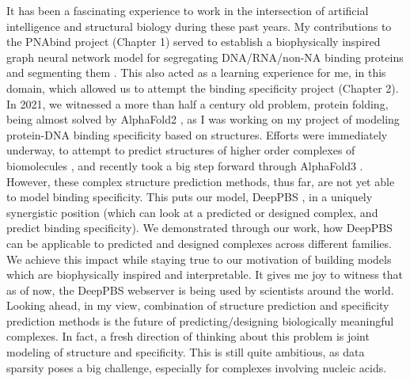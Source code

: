 
It has been a fascinating experience to work in the intersection of artificial intelligence and structural biology during these past years. My contributions to the PNAbind project (Chapter 1) served to establish a biophysically inspired graph neural network model for segregating DNA/RNA/non-NA binding proteins and segmenting them \citep{Sagendorf2024}. This also acted as a learning experience for me, in this domain, which allowed us to attempt the binding specificity project (Chapter 2). In 2021, we witnessed a more than half a century old problem, protein folding, being almost solved by AlphaFold2 \citep{Jumper2021}, as I was working on my project of modeling protein-DNA binding specificity based on structures. Efforts were immediately underway, to attempt to predict structures of higher order complexes of biomolecules \citep{evans2021protein,baek2024na}, and recently took a big step forward through AlphaFold3 \citep{Abramson2024}. However, these complex structure prediction methods, thus far, are not yet able to model binding specificity. This puts our model, DeepPBS \citep{Mitra2024}, in a uniquely synergistic position (which can look at a predicted or designed complex, and predict binding specificity). We demonstrated through our work, how DeepPBS can be applicable to predicted and designed complexes across different families. We achieve this impact while staying true to our motivation of building models which are biophysically inspired and interpretable. It gives me joy to  witness that as of now, the DeepPBS webserver is being used by scientists around the world. Looking ahead, in my view, combination of structure prediction and specificity prediction methods is the future of predicting/designing biologically meaningful complexes. In fact, a fresh direction of thinking about this problem is joint modeling of structure and specificity. This is still quite ambitious, as data sparsity poses a big challenge, especially for complexes involving nucleic acids. 

